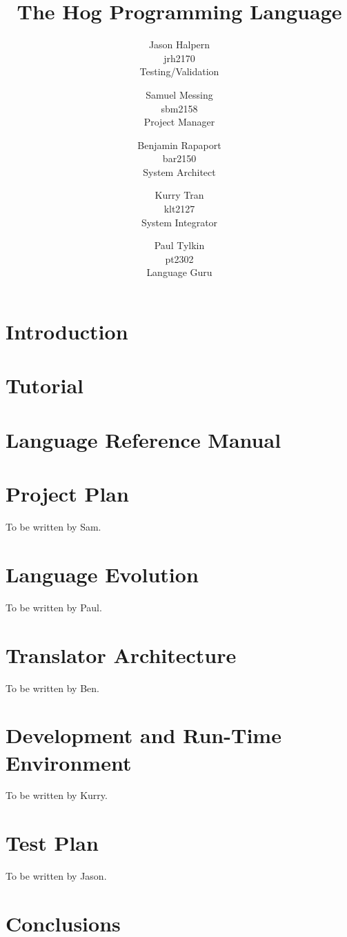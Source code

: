 \documentclass{book}
\title{\huge \textbf{The Hog Programming Language}}
\author{Jason Halpern \\ jrh2170 \\ Testing/Validation
        \and Samuel Messing \\ sbm2158 \\ Project Manager
        \and Benjamin Rapaport \\ bar2150 \\ System Architect
        \and Kurry Tran \\ klt2127 \\ System Integrator
        \and Paul Tylkin \\ pt2302 \\ Language Guru}
\begin{document}
\maketitle

\tableofcontents

\chapter{Introduction}
\label{chap:intro}

\chapter{Tutorial}
\label{chap:tutor}

\chapter{Language Reference Manual}
\label{chap:LRM}

\chapter{Project Plan}
\label{chap:plan}

To be written by Sam.

\chapter{Language Evolution}
\label{chap:evo}

To be written by Paul.


\chapter{Translator Architecture}
\label{chap:trans}

To be written by Ben.

\chapter{Development and Run-Time Environment}
\label{chap:environ}

To be written by Kurry.

\chapter{Test Plan}
\label{chap:test}

To be written by Jason.

\chapter{Conclusions}
\label{chap:concl}
\end{document}

